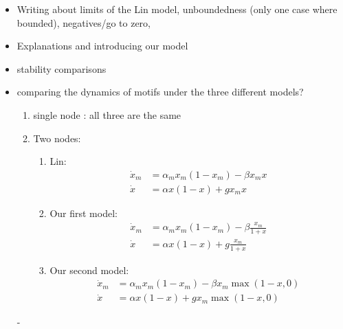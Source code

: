 \documentclass{article}
\begin{document}
\begin{itemize}
    \item Writing about limits of the Lin model, unboundedness (only one case where bounded), negatives/go to zero, 
    \item Explanations and introducing our model
    \item stability comparisons
    \item comparing the dynamics of  motifs under the three different models?
    \begin{enumerate}
        \item single node : all three are the same
        \item Two nodes:

          \begin{enumerate}
              \item Lin: 
              \begin{equation}
            \begin{array}{rl}
                \dot x_m  & = \alpha_m x_m(1-x_m) - \beta x_m x   \\
                 \dot x &= \alpha x(1-x) + g x_mx 
            \end{array}
            \end{equation}
        \item Our first model:
        \begin{equation}
        \begin{array}{rl}
            \dot x_m  & = \alpha_m x_m(1-x_m) - \beta \frac{x_m}{1+x}  \\
             \dot x &= \alpha x(1-x) + g \frac{x_m}{1+x}
        \end{array}
        \end{equation}
        
        \item Our second model:
        \begin{equation}
        \begin{array}{rl}
            \dot x_m  & = \alpha_m x_m(1-x_m) - \beta x_m\max(1-x, 0)   \\
             \dot x &= \alpha x(1-x) + g x_m\max(1-x, 0) 
        \end{array}
        \end{equation}
          \end{enumerate}
    \end{enumerate}
      - 
\end{itemize}








\printbibliography
\end{document}
